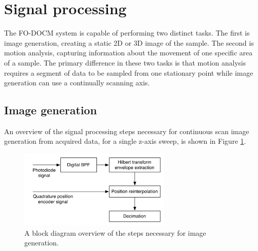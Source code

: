 
\section{Signal processing}
\label{sec:sig_proc}

The FO-DOCM system is capable of performing two distinct tasks. The first is image generation, creating a static 2D or 3D image of the sample. The second is motion analysis, capturing information about the movement of one specific area of a sample. The primary difference in these two tasks is that motion analysis requires a segment of data to be sampled from one stationary point while image generation can use a continually scanning axis.


\subsection{Image generation}
\label{sec:imgen}

An overview of the signal processing steps necessary for continuous scan image generation from acquired data, for a single z-axis sweep, is shown in Figure \ref{fig:imagegen}.

\begin{figure}[h!]
\centering
\includegraphics[width=0.65\textwidth]{Images/Background/image_analysis.png}
\caption{A block diagram overview of the steps necessary for image generation. \label{fig:imagegen}}
\end{figure}


